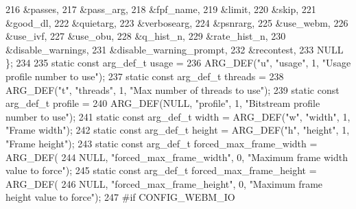 \begin{DoxyCodeInclude}
{{216                                         &passes,
217                                         &pass\_arg,
218                                         &fpf\_name,
219                                         &limit,
220                                         &skip,
221                                         &good\_dl,
222                                         &quietarg,
223                                         &verbosearg,
224                                         &psnrarg,
225                                         &use\_webm,
226                                         &use\_ivf,
227                                         &use\_obu,
228                                         &q\_hist\_n,
229                                         &rate\_hist\_n,
230                                         &disable\_warnings,
231                                         &disable\_warning\_prompt,
232                                         &recontest,
233                                         NULL \};
234 
235 \textcolor{keyword}{static} \textcolor{keyword}{const} arg\_def\_t usage =
236     ARG\_DEF(\textcolor{stringliteral}{"u"}, \textcolor{stringliteral}{"usage"}, 1, \textcolor{stringliteral}{"Usage profile number to use"});
237 \textcolor{keyword}{static} \textcolor{keyword}{const} arg\_def\_t threads =
238     ARG\_DEF(\textcolor{stringliteral}{"t"}, \textcolor{stringliteral}{"threads"}, 1, \textcolor{stringliteral}{"Max number of threads to use"});
239 \textcolor{keyword}{static} \textcolor{keyword}{const} arg\_def\_t profile =
240     ARG\_DEF(NULL, \textcolor{stringliteral}{"profile"}, 1, \textcolor{stringliteral}{"Bitstream profile number to use"});
241 \textcolor{keyword}{static} \textcolor{keyword}{const} arg\_def\_t width = ARG\_DEF(\textcolor{stringliteral}{"w"}, \textcolor{stringliteral}{"width"}, 1, \textcolor{stringliteral}{"Frame width"});
242 \textcolor{keyword}{static} \textcolor{keyword}{const} arg\_def\_t height = ARG\_DEF(\textcolor{stringliteral}{"h"}, \textcolor{stringliteral}{"height"}, 1, \textcolor{stringliteral}{"Frame height"});
243 \textcolor{keyword}{static} \textcolor{keyword}{const} arg\_def\_t forced\_max\_frame\_width = ARG\_DEF(
244     NULL, \textcolor{stringliteral}{"forced\_max\_frame\_width"}, 0, \textcolor{stringliteral}{"Maximum frame width value to force"});
245 \textcolor{keyword}{static} \textcolor{keyword}{const} arg\_def\_t forced\_max\_frame\_height = ARG\_DEF(
246     NULL, \textcolor{stringliteral}{"forced\_max\_frame\_height"}, 0, \textcolor{stringliteral}{"Maximum frame height value to force"});
247 \textcolor{preprocessor}{#if CONFIG\_WEBM\_IO}
}}
\end{DoxyCodeInclude}
